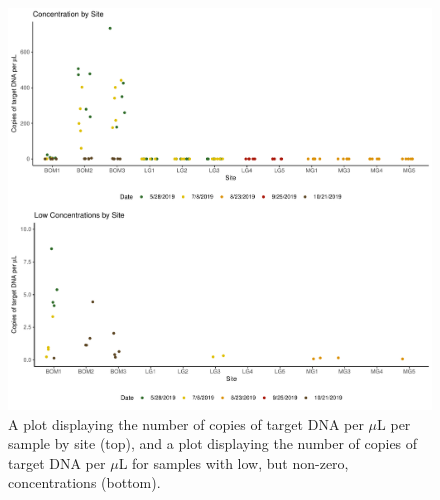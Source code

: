\documentclass[12pt]{article}\usepackage[]{graphicx}\usepackage[]{color}
\makeatletter
\def\maxwidth{ %
  \ifdim\Gin@nat@width>\linewidth
    \linewidth
  \else
    \Gin@nat@width
  \fi
}
\newenvironment{knitrout}{}{} %
\def\maxwidth{ %
  \ifdim\Gin@nat@width>\linewidth
    \linewidth
  \else
    \Gin@nat@width
  \fi
}
\newenvironment{knitrout}{}{} %
\makeatother
\begin{document}
\begin{figure}[]
\begin{knitrout}
\color{fgcolor}

{\centering \includegraphics[width=\maxwidth]{figure/eDNA_visualization_concentration-1} 

}



\end{knitrout}
\caption{A plot displaying the number of copies of target DNA per $\mu$L per sample by site (top), and a plot displaying the number of copies of target DNA per $\mu$L for samples with low, but non-zero, concentrations (bottom).}
\label{fig:eDNA_concentration}
\end{figure}
\end{document}
